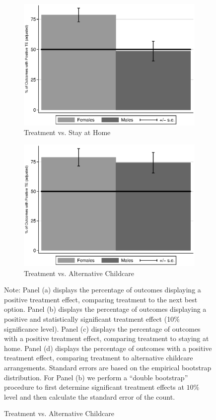 \begin{figure}
\begin{subfigure}[h]{0.4\textwidth}
\end{subfigure}
\begin{subfigure}[h]{0.4\textwidth}
		\centering
		\caption{ Treatment vs. Stay at Home} \label{fig:ppositivehome}
		\includegraphics[width=\textwidth]{output/epan_ipw_p0_all.eps}
\end{subfigure}%
\begin{subfigure}[h]{0.4\textwidth}
	\centering
	\caption{Treatment vs. Alternative Childcare} \label{fig:ppositivealternative}
		\includegraphics[width=\textwidth]{output/epan_ipw_p1_all.eps}
\end{subfigure}
\scriptsize \justify
Note: Panel (a) displays the percentage of outcomes displaying a positive treatment effect, comparing treatment to the next best option. Panel (b) displays the percentage of outcomes displaying a positive and statistically significant treatment effect (10\% significance level). Panel (c) displays the percentage of outcomes with a positive treatment effect, comparing treatment to staying at home. Panel (d) displays the percentage of outcomes with a positive treatment effect, comparing treatment to alternative childcare arrangements. Standard errors are based on the empirical bootstrap distribution. For Panel (b) we perform a ``double bootstrap'' procedure to first determine significant treatment effects at $10\%$ level and then calculate the standard error of the count.\\
\end{figure}

